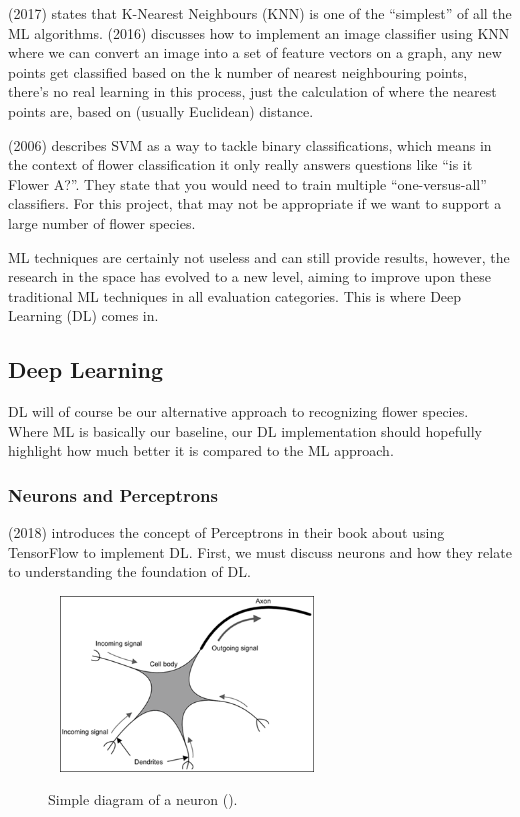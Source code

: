 \documentclass{article}
\begin{document}
\citeauthor{MohammedMohssen2017Ml:a} (2017) states that K-Nearest Neighbours (KNN) is one of the “simplest” of  all the 
ML algorithms. \citeauthor{rosebook2016} (2016) discusses how to implement an image classifier using KNN where we can 
convert an image into a set of feature vectors on a graph, any new points get classified based on the k number of 
nearest neighbouring points, there's no real learning in this process, just the calculation of where the nearest points 
are, based on (usually Euclidean) distance.

\par

\citeauthor{NobleWilliamS2006Wias} (2006) describes SVM as a way to tackle binary classifications, which means in the 
context of flower classification it only really answers questions like “is it Flower A?”. They state that you would need
to train multiple “one-versus-all” classifiers. For this project, that may not be appropriate if we want to support a 
large number of flower species.

\par

ML techniques are certainly not useless and can still provide results, however, the research in the space has evolved 
to a new level, aiming to improve upon these traditional ML techniques in all evaluation categories. This is where Deep
Learning (DL) comes in.

\subsection{Deep Learning}

DL will of course be our alternative approach to recognizing flower species. Where ML is basically our baseline, our DL 
implementation should hopefully highlight how much better it is compared to the ML approach.

\subsubsection{Neurons and Perceptrons}

\citeauthor{ScarpinoMatthew2018Tfd} (2018) introduces the concept of Perceptrons in their book about using TensorFlow 
to implement DL. First, we must discuss neurons and how they relate to understanding the foundation of DL.

\begin{figure}[h]\
    \centering
    \includegraphics[width=0.6\textwidth]{neuron.png}
    \caption{Simple diagram of a neuron (\cite{ScarpinoMatthew2018Tfd}).}
\end{figure}
\end{document}
